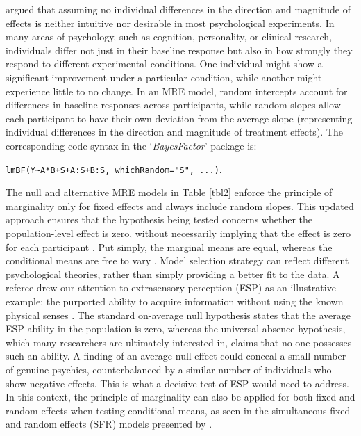 \documentclass[preprint,12pt,authoryear]{elsarticle}
\begin{document}
\citet{van_den_bergh_bayesian_2023} argued that assuming no individual differences in the direction and magnitude of effects is neither intuitive nor desirable in most psychological experiments. In many areas of psychology, such as cognition, personality, or clinical research, individuals differ not just in their baseline response but also in how strongly they respond to different experimental conditions. One individual might show a significant improvement under a particular condition, while another might experience little to no change. In an MRE model, random intercepts account for differences in baseline responses across participants, while random slopes allow each participant to have their own deviation from the average slope (representing individual differences in the direction and magnitude of treatment effects). The corresponding code syntax in the `\textit{BayesFactor}' package is:
\begin{center}
	\texttt{lmBF(Y\textasciitilde A*B+S+A:S+B:S, whichRandom="S", ...)}.
\end{center}

The null and alternative MRE models in Table \ref{tbl2} enforce the principle of marginality only for fixed effects and always include random slopes. This updated approach ensures that the hypothesis being tested concerns whether the population-level effect is zero, without necessarily implying that the effect is zero for each participant \citep[p.~650]{oberauer_importance_2022}. Put simply, the marginal means are equal, whereas the conditional means are free to vary \citep{lee_conditional_2004}. Model selection strategy can reflect different psychological theories, rather than simply providing a better fit to the data. A referee drew our attention to extrasensory perception (ESP) as an illustrative example: the purported ability to acquire information without using the known physical senses \citep[e.g.,][]{bem_feeling_2011}. The standard on-average null hypothesis states that the average ESP ability in the population is zero, whereas the universal absence hypothesis, which many researchers are ultimately interested in, claims that no one possesses such an ability. A finding of an average null effect could conceal a small number of genuine psychics, counterbalanced by a similar number of individuals who show negative effects. This is what a decisive test of ESP would need to address. In this context, the principle of marginality can also be applied for both fixed and random effects when testing conditional means, as seen in the simultaneous fixed and random effects (SFR) models presented by \citet{van_den_bergh_bayesian_2023}.
\end{document}
